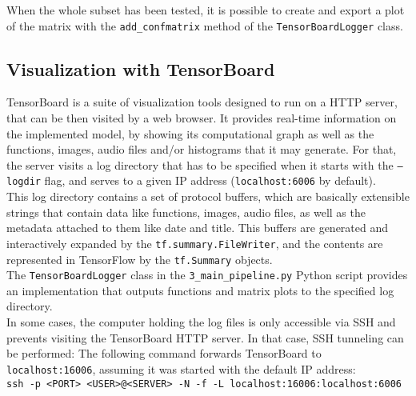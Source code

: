   When the whole subset has been tested, it is possible to create and export a plot of the matrix with the \texttt{add\_confmatrix} method of the \texttt{TensorBoardLogger} class.

  \subsection{Visualization with TensorBoard}  \label{tb-visualization}

  TensorBoard is a suite of visualization tools designed to run on a HTTP server, that can be then visited by a web browser. It provides real-time information on the implemented model, by showing its computational graph as well as the functions, images, audio files and/or histograms that it may generate. For that, the server visits a log directory that has to be specified when it starts with the \texttt{--logdir} flag, and serves to a given IP address (\texttt{localhost:6006} by default).\\

  This log directory contains a set of protocol buffers\cite{protobufs}, which are basically extensible strings that contain data like functions, images, audio files, as well as the metadata attached to them like date and title. This buffers are generated and interactively expanded by the \texttt{tf.summary.FileWriter}, and the contents are represented in TensorFlow by the \texttt{tf.Summary} objects.\\

  The \texttt{TensorBoardLogger} class in the \texttt{3\_main\_pipeline.py} Python script provides an implementation that outputs functions and matrix plots to the specified log directory.\\

  In some cases, the computer holding the log files is only accessible via SSH and prevents visiting the TensorBoard HTTP server. In that case, SSH tunneling can be performed: The following command forwards TensorBoard to \texttt{localhost:16006}, assuming it was started with the default IP address:\\
  \texttt{ssh -p <PORT> <USER>@<SERVER> -N -f -L localhost:16006:localhost:6006}

